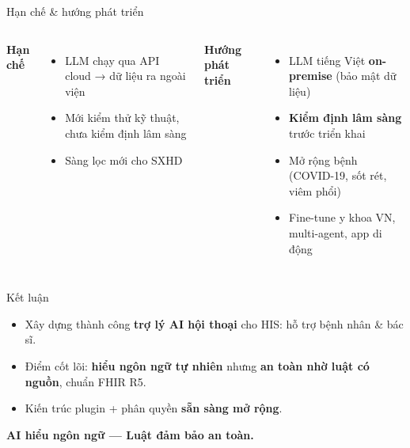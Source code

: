 \documentclass[aspectratio=169,t]{beamer}
\begin{document}
\begin{frame}{Hạn chế \& hướng phát triển}
  \small
  \begin{columns}[t]
      \textbf{\color{hustprimary}Hạn chế}
      \begin{itemize}
        \item LLM chạy qua API cloud → dữ liệu ra ngoài viện
        \item Mới kiểm thử kỹ thuật, chưa kiểm định lâm sàng
        \item Sàng lọc mới cho SXHD
      \end{itemize}
      \textbf{\color{hustprimary}Hướng phát triển}
      \begin{itemize}
        \item LLM tiếng Việt \textbf{on-premise} (bảo mật dữ liệu)
        \item \textbf{Kiểm định lâm sàng} trước triển khai
        \item Mở rộng bệnh (COVID-19, sốt rét, viêm phổi)
        \item Fine-tune y khoa VN, multi-agent, app di động
      \end{itemize}
  \end{columns}
\end{frame}

\begin{frame}{Kết luận}
  \begin{itemize}
    \item Xây dựng thành công \textbf{trợ lý AI hội thoại} cho HIS: hỗ trợ bệnh nhân \& bác sĩ.
    \item Điểm cốt lõi: \textbf{hiểu ngôn ngữ tự nhiên} nhưng \textbf{an toàn nhờ luật có nguồn}, chuẩn FHIR R5.
    \item Kiến trúc plugin + phân quyền \textbf{sẵn sàng mở rộng}.
  \end{itemize}
  \vspace{0.3cm}
  \begin{center}\color{hustprimary}\large\textbf{AI hiểu ngôn ngữ — Luật đảm bảo an toàn.}\end{center}
\end{frame}

\hustthankyou
\end{document}

